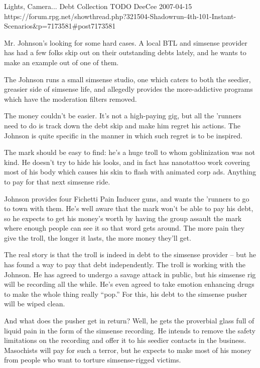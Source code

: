 \begin{scenario}{Lights, Camera...}
	{Debt Collection}
	{TODO}
	{DeeCee}
	{2007-04-15}
	{https://forum.rpg.net/showthread.php?321504-Shadowrun-4th-101-Instant-Scenarios\&p=7173581#post7173581}

  Mr. Johnson's looking for some hard cases. A local BTL and simsense provider has had a few folks skip out on their outstanding debts lately, and he wants to make an example out of one of them.

The Johnson runs a small simsense studio, one which caters to both the seedier, greasier side of simsense life, and allegedly provides the more-addictive programs which have the moderation filters removed.

\synopsis  The money couldn't be easier. It's not a high-paying gig, but all the 'runners need to do is track down the debt skip and make him regret his actions. The Johnson is quite specific in the manner in which such regret is to be inspired.

The mark should be easy to find: he's a huge troll to whom goblinization was not kind. He doesn't try to hide his looks, and in fact has nanotattoo work covering most of his body which causes his skin to flash with animated corp ads. Anything to pay for that next simsense ride.

Johnson provides four Fichetti Pain Inducer guns, and wants the 'runners to go to town with them. He's well aware that the mark won't be able to pay his debt, so he expects to get his money's worth by having the group assault the mark where enough people can see it so that word gets around. The more pain they give the troll, the longer it lasts, the more money they'll get.

\notes  The real story is that the troll is indeed in debt to the simsense provider – but he has found a way to pay that debt independently. The troll is working with the Johnson. He has agreed to undergo a savage attack in public, but his simsense rig will be recording all the while. He's even agreed to take emotion enhancing drugs to make the whole thing really ``pop.'' For this, his debt to the simsense pusher will be wiped clean.

And what does the pusher get in return? Well, he gets the proverbial glass full of liquid pain in the form of the simsense recording. He intends to remove the safety limitations on the recording and offer it to his seedier contacts in the business. Masochists will pay for such a terror, but he expects to make most of his money from people who want to torture simsense-rigged victims.


\end{scenario}
